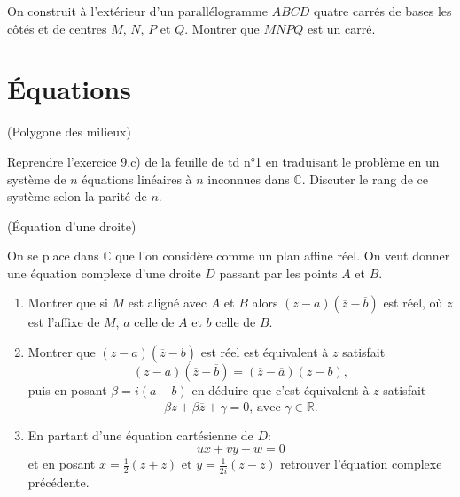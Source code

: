 \documentclass[a4paper,12pt,reqno]{amsart}
\begin{document}
\begin{exo}


  On construit à l'extérieur d'un parallélogramme $ABCD$ quatre carrés de bases les côtés et de centres $M$, $N$, $P$ et $Q$. Montrer que $MNPQ$ est un carré.
\end{exo}



\section{Équations}


\begin{exo} (Polygone des milieux)

  Reprendre l'exercice 9.c) de la feuille de td n°1 en traduisant le problème en un système de $n$ équations linéaires à $n$ inconnues dans $\mathbb{C}$. Discuter le rang de ce système selon la parité de $n$.
\end{exo}


\begin{exo} (Équation d'une droite)

  On se place dans $\mathbb{C}$ que l'on considère comme un plan affine réel. On veut donner une équation complexe d'une droite $D$ passant par les points $A$ et $B$.
  \begin{enumerate}
    \item Montrer que si $M$ est aligné avec $A$ et $B$ alors $(z-a)(\overline{z}-\overline{b})$ est réel, où $z$ est l'affixe de $M$, $a$ celle de $A$ et $b$ celle de $B$.
    \item Montrer que $(z-a)(\overline{z}-\overline{b})$ est réel est équivalent à $z$ satisfait
      $$
        (z-a)(\overline{z}-\overline{b})=(\overline{z}-\overline{a})(z-b),
      $$
      puis en posant $\beta=i(a-b)$ en déduire que c'est équivalent à $z$ satisfait
      $$
        \overline{\beta}z+\beta\overline{z}+\gamma=0 \text{, avec } \gamma \in \mathbb{R}.
      $$
    \item En partant d'une équation cartésienne de $D$:
      $$
        ux+vy+w=0
      $$
      et en posant $x=\frac{1}{2}(z+\overline{z})$ et $y=\frac{1}{2i}(z-\overline{z})$ retrouver l'équation complexe précédente.
  \end{enumerate}
\end{exo}
\end{document}
